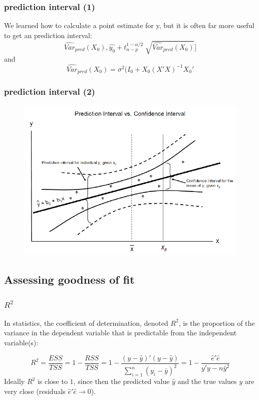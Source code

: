\documentclass{beamer}
\begin{document}
\begin{frame}
\frametitle{prediction interval (1)}
We learned how to calculate a point estimate for y, but it is often far more useful to get an prediction interval: 
\begin{equation*}
[\hat{y_0} - t_{n-p}^{1-\alpha/2} \sqrt[]{\hat{Var}_{pred}(X_0)}, \hat{y_0} + t_{n-p}^{1-\alpha/2} \sqrt[]{\hat{Var}_{pred}(X_0)}  ]
\end{equation*}
and 
\begin{equation*}
\hat{Var}_{pred}(X_0)  =  \sigma^2 (I_0 + X_0(X'X)^{-1} X_0'
\end{equation*}

\end{frame}
 \begin{frame}
 \frametitle{prediction interval (2)}
 \begin{figure}
\includegraphics[width=0.8\linewidth]{figures/03/Prediction-Interval-vs-Confidence-Interval.png}
\end{figure}
 \end{frame}


\subsection{Assessing goodness of fit}
\begin{frame}
\frametitle{$R^2$}
In statistics, the coefficient of determination, denoted $R^2$, is the proportion of the variance in the dependent variable that is predictable from the independent variable(s):

\begin{equation}
R^2 = \frac{ESS}{TSS} = 1- \frac{RSS}{TSS} = 1- \frac{(y-\hat{y})'(y-\hat{y})}{\sum_{i = 1}^{n}{ (y_i - \bar{y} )^2}}= 1- \frac{\hat{e}'\hat{e}}{y'y - n\bar{y}^2}
\end{equation}
Ideally $R^2$ is close to $1$, since then the predicted value $\hat{y}$ and the true values $y$ are very close (residuals $\hat{e}'\hat{e} \rightarrow 0$). 
\end{frame}
\end{document}

